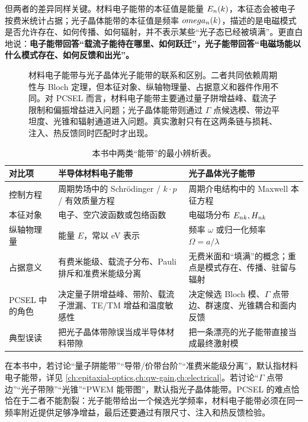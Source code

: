 但两者的差异同样关键。材料电子能带的本征值是能量 $E_n(k)$，本征态会被电子按费米统计占据；光子晶体能带的本征值是频率 $omega_n(k)$，描述的是电磁模式是否允许存在、如何传播、如何辐射，并不表示某些“光子态已经被填满”。更直白地说：\textbf{电子能带回答“载流子能待在哪里、如何跃迁”，光子能带回答“电磁场能以什么模式存在、如何反馈和出光”。}

\begin{figure}[htbp]
  \centering
  
  \caption{材料电子能带与光子晶体光子能带的联系和区别。二者共同依赖周期性与 Bloch 定理，但本征对象、纵轴物理量、占据意义和器件作用不同。对 PCSEL 而言，材料电子能带主要通过量子阱增益峰、载流子限制和偏振增益进入问题；光子晶体能带则通过 $\Gamma$ 点候选模、带边平坦度、光锥和辐射通道进入问题。真实激射只有在这两条链与损耗、注入、热反馈同时匹配时才出现。}
  \label{fig:ch05_electronic_photonic_band_contrast}
\end{figure}

\begin{table}[htbp]
  \centering
  \small
  \caption{本书中两类“能带”的最小辨析表。}
  \label{tab:ch05_band_contrast}
  \begin{tabularx}{\textwidth}{p{}YY}
    \toprule
    对比项 & 半导体材料电子能带 & 光子晶体光子能带 \\
    \midrule
    控制方程 &
    周期势场中的 Schr\"odinger / $k\cdot p$ / 有效质量方程 &
    周期介电结构中的 Maxwell 本征方程 \\
    本征对象 &
    电子、空穴波函数或包络函数 &
    电磁场分布 $E_{nk},H_{nk}$ \\
    纵轴物理量 &
    能量 $E$，常以 eV 表示 &
    频率 $\omega$ 或归一化频率 $\Omega=a/\lambda$ \\
    占据意义 &
    有费米能级、载流子分布、Pauli 排斥和准费米能级分离 &
    无费米面和“填满”的概念；重点是模式存在、传播、驻留与辐射 \\
    PCSEL 中的角色 &
    决定量子阱增益峰、带阶、载流子泄漏、TE/TM 增益和温度敏感性 &
    决定候选 Bloch 模、$\Gamma$ 点带边、群速度、光锥耦合和面内反馈 \\
    典型误读 &
    把光子晶体带隙误当成半导体材料带隙 &
    把一条漂亮的光子能带直接当成最终激射模 \\
    \bottomrule
  \end{tabularx}
\end{table}

在本书中，若讨论“量子阱能带”“导带/价带台阶”“准费米能级分离”，默认指材料电子能带，详见 \cref{ch:epitaxial-optics,ch:qw-gain,ch:electrical}。若讨论“$\Gamma$ 点带边”“光子带隙”“光锥”“PWEM 能带图”，默认指光子晶体能带。PCSEL 的难点恰恰在于二者不能割裂：光子能带给出一个候选光学频率，材料电子能带必须在同一频率附近提供足够净增益，最后还要通过有限尺寸、注入和热反馈检验。

